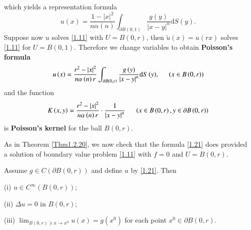 which yields a representation formula 
$$
u\left( x \right) =\frac{1-\left| x \right|^2}{n\alpha \left( n \right)}\int_{\partial B\left( 0,1 \right)}{\frac{g\left( y \right)}{\left| x-y \right|^n}\mathrm{d}S\left( y \right)}.
$$
Suppose now $u$ solves \eqref{1.11} with $U=B(0,r)$, then $\widetilde{u}(x)=u(rx)$ solves \eqref{1.11} for $U=B(0,1)$. Therefore we change variables to obtain \textbf{Poisson's formula} 
\begin{equation}\label{1.21}
u\left( x \right) =\frac{r^2-\left| x \right|^2}{n\alpha \left( n \right) r}\int_{\partial B\left( 0,r \right)}{\frac{g\left( y \right)}{\left| x-y \right|^n}\mathrm{d}S\left( y \right)},\hspace{0.5cm}\left( x\in B\left( 0,r \right) \right) 
\end{equation}
and the function 
$$
K\left( x,y \right) =\frac{r^2-\left| x \right|^2}{n\alpha \left( n \right) r}\cdot \frac{1}{\left| x-y \right|^n}\hspace{0.5cm}\left( x\in B\left( 0,r \right) ,y\in \partial B\left( 0,r \right) \right) 
$$
is \textbf{Poisson's kernel} for the ball $B(0,r)$.\par
As in Theorem \ref{Thm1.2.20}, we now check that the formula \eqref{1.21} does provided a solution of boundary value problem \eqref{1.11} with $f=0$ and $U=B(0,r)$.
\begin{theorem}
Assume $g\in C(\partial B(0,r))$ and define $u$ by \eqref{1.21}. Then \par
(i) $u\in C^\infty(B(0,r))$;\par
(ii) $\Delta u=0$ in $B(0,r)$;\par
(iii) $\lim_{B(0,r)\ni x\to x^0}u(x)=g(x^0)$ for each point $x^0\in\partial B(0,r)$.
\end{theorem}
